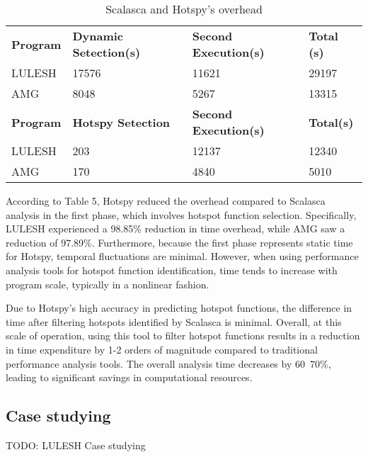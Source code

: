 \documentclass[lineno,sn-mathphys]{sn-jnl}%
\theoremstyle{thmstyleone}%
\theoremstyle{thmstyletwo}%
\theoremstyle{thmstylethree}%
\begin{document}
 \begin{table*}[ht]
     \centering
     \caption{Scalasca and Hotspy's overhead}
     \begin{tabular}{@{}llll@{}}
     \hline
     \textbf{Program} & \textbf{Dynamic Setection(s)} & \textbf{Second Execution(s)} & \textbf{Total (s)} \\ 
     LULESH & 17576 & 11621 & 29197\\
     AMG & 8048 & 5267 & 13315 \\
     \hline
     \textbf{Program} & \textbf{Hotspy Setection} & \textbf{Second Execution(s)} & \textbf{Total(s)} \\ 
     LULESH & 203 & 12137 & 12340\\
     AMG & 170 & 4840 & 5010\\
     \end{tabular}
\end{table*}
 According to Table 5, Hotspy reduced the overhead compared to Scalasca analysis in the first phase, which involves hotspot function selection. Specifically, LULESH experienced a 98.85\% reduction in time overhead, while AMG saw a reduction of 97.89\%. Furthermore, because the first phase represents static time for Hotspy, temporal fluctuations are minimal. However, when using performance analysis tools for hotspot function identification, time tends to increase with program scale, typically in a nonlinear fashion.\par
 Due to Hotspy's high accuracy in predicting hotspot functions, the difference in time after filtering hotspots identified by Scalasca is minimal. Overall, at this scale of operation, using this tool to filter hotspot functions results in a reduction in time expenditure by 1-2 orders of magnitude compared to traditional performance analysis tools. The overall analysis time decreases by 60~70\%, leading to significant savings in computational resources.
 \subsection{Case studying}
 TODO: LULESH Case studying
\end{document}
